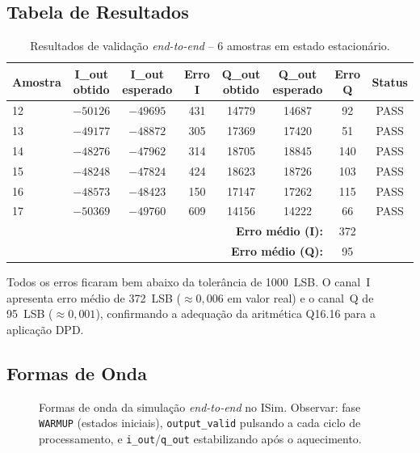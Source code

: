 \documentclass[a4paper,12pt]{article}
\begin{document}
\subsection{Tabela de Resultados}

\begin{table}[H]
\centering
\caption{Resultados de valida\c{c}\~ao \textit{end-to-end} -- 6 amostras em estado estacion\'ario.}
\small
\begin{tabular}{lccccccc}
\hline
\textbf{Amostra} &
\textbf{I\_out obtido} & \textbf{I\_out esperado} & \textbf{Erro I} &
\textbf{Q\_out obtido} & \textbf{Q\_out esperado} & \textbf{Erro Q} &
\textbf{Status} \\
\hline
12 & $-50126$ & $-49695$ & 431 & 14779 & 14687 &  92 & PASS \\
13 & $-49177$ & $-48872$ & 305 & 17369 & 17420 &  51 & PASS \\
14 & $-48276$ & $-47962$ & 314 & 18705 & 18845 & 140 & PASS \\
15 & $-48248$ & $-47824$ & 424 & 18623 & 18726 & 103 & PASS \\
16 & $-48573$ & $-48423$ & 150 & 17147 & 17262 & 115 & PASS \\
17 & $-50369$ & $-49760$ & 609 & 14156 & 14222 &  66 & PASS \\
\hline
\multicolumn{6}{r}{\textbf{Erro m\'edio (I):}} & 372 & \\
\multicolumn{6}{r}{\textbf{Erro m\'edio (Q):}} &  95 & \\
\hline
\end{tabular}
\end{table}

Todos os erros ficaram bem abaixo da toler\^ancia de 1000~LSB. O canal~I apresenta erro m\'edio de 372~LSB ($\approx 0{,}006$ em valor real) e o canal~Q de 95~LSB ($\approx 0{,}001$), confirmando a adequa\c{c}\~ao da aritm\'etica Q16.16 para a aplica\c{c}\~ao DPD.

\subsection{Formas de Onda}

\begin{figure}[H]
\centering
{}
\caption{Formas de onda da simula\c{c}\~ao \textit{end-to-end} no ISim. Observar: fase \texttt{WARMUP} (estados iniciais), \texttt{output\_valid} pulsando a cada ciclo de processamento, e \texttt{i\_out}/\texttt{q\_out} estabilizando ap\'os o aquecimento.}
\label{fig:waveform_top}
\end{figure}
\end{document}
